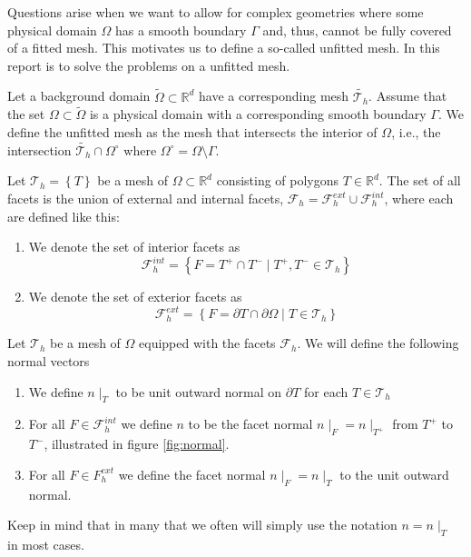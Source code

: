 Questions arise when we want to allow for complex geometries where some physical domain $\Omega $ has a smooth boundary $\Gamma $ and, thus, cannot be fully covered of a fitted mesh. This motivates us to define a so-called unfitted mesh. In this
report is  to solve the problems on a unfitted mesh.

\begin{definition}
 Let a background domain $\widetilde{\Omega } \subset \mathbb{R} ^{d} $ have a corresponding mesh $\widetilde{\mathcal{T} _{h}}$.
Assume that the set $\Omega\subset   \widetilde{\Omega }  $ is a physical domain with a corresponding smooth boundary $\Gamma$. We define the unfitted mesh as the mesh that intersects the interior of $\Omega$, i.e., the intersection $\widetilde{\mathcal{T}_{h} } \cap
 \Omega^{\circ }     $ where $ \Omega ^{\circ } = \Omega \setminus \Gamma  $.
\end{definition}


\begin{definition}[Facets]
Let $\mathcal{T}_{h}  = \left\{ T \right\} $ be a mesh of $\Omega \subset  \mathbb{R} ^d $ consisting of polygons $T \in \mathbb{R} ^{d}$.
The set of all facets is the union of external and internal facets, $\mathcal{F} _{h} = \mathcal{F} ^{ext}_{h} \cup \mathcal{F} _{h}^{int} $, where each are defined like this:
\begin{enumerate}[label=\arabic*)]
    \item We denote the set of interior facets as \[
            \mathcal{F}^{int} _{h} = \left\{ F=T^{+}\cap T^{-}  \mid  T^{+}, T^{-} \in \mathcal{T}_{h}  \right\}
\]
\item We denote the set of exterior facets as
\[
            \mathcal{F}^{ext} _{h} = \left\{ F= \partial T \cap \partial \Omega    \mid  T  \in \mathcal{T}_{h}  \right\}
\]
\end{enumerate}
\end{definition}


\begin{definition}
Let $\mathcal{T}_{h} $ be a mesh of $\Omega $ equipped with the facets $\mathcal{F}_{h} $. We will define the following normal vectors
\begin{enumerate}[label=\arabic*)]
    \item We define $n \mid _{T}$ to be unit outward normal on $\partial T$ for each $T \in \mathcal{T}_{h} $
 \item For all $F \in \mathcal{F }^{int} _{h}$ we define $n$ to be the facet normal $ n  \mid_F = n \mid _{T^{+}} $  from $T^{+}$ to $T^{-}$, illustrated in figure \ref{fig:normal}.
 \item For all $F \in F^{ext}_{h}$ we define the facet normal $n \mid _{F} = n \mid _{T} $ to the unit outward normal.
\end{enumerate}
Keep in mind that in many that we often will simply use the notation $n = n \mid _{T}$ in most cases.
\end{definition}


